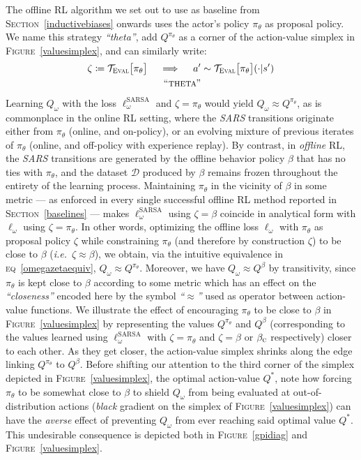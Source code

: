The offline RL algorithm we set out to use as baseline from \textsc{Section}~\ref{inductivebiases} onwards
uses the actor's policy $\pi_\theta$ as proposal policy.
We name this strategy \textit{``theta''},
add $Q^{\pi_\theta}$ as a corner of the action-value simplex in \textsc{Figure}~\ref{valuesimplex},
and can similarly write:
\begin{align}
  \zeta \coloneqq \mathcal{T}_\textsc{Eval}\big[\pi_\theta\big]
  \quad \implies \quad
  a' &\sim \mathcal{T}_\textsc{Eval}\big[\pi_\theta\big](\cdot | s')
  \\ \tag*{\textsc{``theta''}}
  \label{theta}
\end{align}
Learning $Q_\omega$ with the loss $\ell^\text{SARSA}_\omega$ and $\zeta = \pi_\theta$
would yield $Q_\omega \approx Q^{\pi_\theta}$,
as is commonplace in the online RL setting,
where the \textit{SARS} transitions
originate either from $\pi_\theta$ (online, and on-policy),
or an evolving mixture of previous iterates of $\pi_\theta$ (online, and off-policy with experience replay).
By contrast, in \textit{offline} RL,
the \textit{SARS} transitions are generated by the offline behavior policy $\beta$
that has no ties with $\pi_\theta$, and the dataset $\mathcal{D}$ produced by $\beta$ remains
frozen throughout the entirety of the learning process.
Maintaining $\pi_\theta$ in the vicinity of $\beta$ in some metric ---
as enforced in every single successful offline RL method reported in \textsc{Section}~\ref{baselines} ---
makes $\ell^\text{SARSA}_\omega$ using $\zeta = \beta$ coincide in analytical form with
$\ell_\omega$ using $\zeta = \pi_\theta$.
In other words, optimizing the offline loss $\ell_\omega$
with $\pi_\theta$ as proposal policy $\zeta$ while constraining $\pi_\theta$
(and therefore by construction $\zeta$) to be close to $\beta$ (\textit{i.e.}~$\zeta \approx \beta$),
we obtain, via the intuitive equivalence in \textsc{eq}~\ref{omegazetaequiv},
$Q_\omega \approx Q^{\pi_\theta}$.
Moreover, we have $Q_\omega \approx Q^\beta$ by transitivity, since $\pi_\theta$ is kept close to $\beta$
according to some metric which has an effect on the \textit{``closeness''} encoded here by the symbol
\textit{``$\approx$''} used as operator between action-value functions.
We illustrate the effect of encouraging $\pi_\theta$ to be close to $\beta$ in \textsc{Figure}~\ref{valuesimplex}
by representing the values $Q^{\pi_\theta}$ and $Q^\beta$
(corresponding to the values learned using $\ell^\text{SARSA}_\omega$ with
$\zeta = \pi_\theta$ and $\zeta = \beta$ or $\beta_\textsc{c}$ respectively) closer to each other.
As they get closer, the action-value simplex shrinks along the edge linking $Q^{\pi_\theta}$ to $Q^\beta$.
Before shifting our attention to the third corner of the simplex depicted in \textsc{Figure}~\ref{valuesimplex},
the optimal action-value $Q^*$, note how forcing $\pi_\theta$ to be somewhat close to $\beta$
to shield $Q_\omega$ from being evaluated at out-of-distribution actions (\textit{black} gradient
on the simplex of \textsc{Figure}~\ref{valuesimplex}) can have the \emph{averse} effect
of preventing $Q_\omega$ from ever reaching said optimal value $Q^*$.
This undesirable consequence is depicted both in
\textsc{Figure}~\ref{gpidiag} and \textsc{Figure}~\ref{valuesimplex}.

